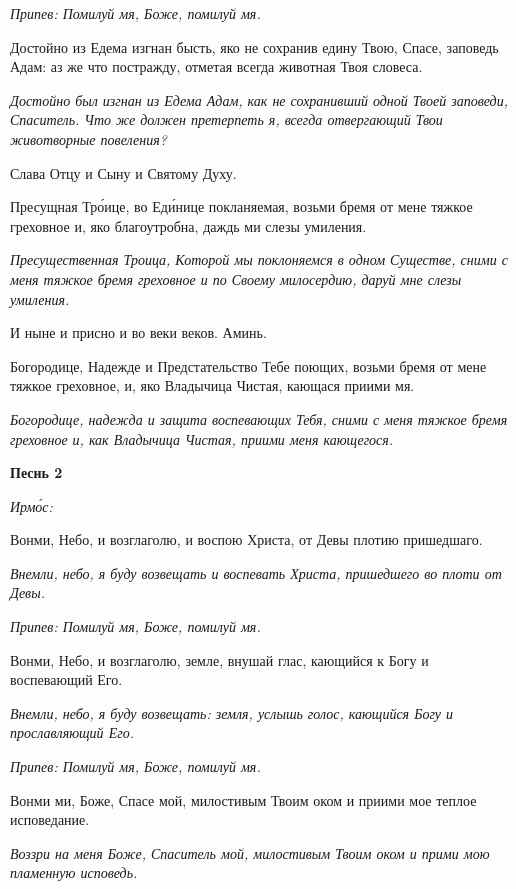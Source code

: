 \itshape Припев:\normalfont{} Помилуй мя, Боже, помилуй мя.


Достойно из Едема изгнан бысть, яко не сохранив едину Твою, Спасе, заповедь Адам: аз же что постражду, отметая всегда животная Твоя словеса.


\itshape Достойно был изгнан из Едема Адам, как не сохранивший одной Твоей заповеди, Спаситель. Что же должен претерпеть я, всегда отвергающий Твои животворные повеления?\normalfont{}


Слава Отцу и Сыну и Святому Духу.


Пресущная Тро́ице, во Еди́нице покланяемая, возьми бремя от мене тяжкое греховное и, яко благоутробна, даждь ми слезы умиления.


\itshape Пресущественная Троица, Которой мы поклоняемся в одном Существе, сними с меня тяжкое бремя греховное и по Своему милосердию, даруй мне слезы умиления.\normalfont{}


И ныне и присно и во веки веков. Аминь.


Богородице, Надежде и Предстательство Тебе поющих, возьми бремя от мене тяжкое греховное, и, яко Владычица Чистая, кающася приими мя.


\itshape Богородице, надежда и защита воспевающих Тебя, сними с меня тяжкое бремя греховное и, как Владычица Чистая, приими меня кающегося.\normalfont{}





\bfseries Песнь 2\normalfont{}


\itshape Ирмо́с:\normalfont{}


Вонми, Небо, и возглаголю, и воспою Христа, от Девы плотию пришедшаго.


\itshape Внемли, небо, я буду возвещать и воспевать Христа, пришедшего во плоти от Девы.\normalfont{}


\itshape Припев:\normalfont{} Помилуй мя, Боже, помилуй мя.


Вонми, Небо, и возглаголю, земле, внушай глас, кающийся к Богу и воспевающий Его.


\itshape Внемли, небо, я буду возвещать: земля, услышь голос, кающийся Богу и прославляющий Его.\normalfont{}


\itshape Припев:\normalfont{} Помилуй мя, Боже, помилуй мя.


Вонми ми, Боже, Спасе мой, милостивым Твоим оком и приими мое теплое исповедание.


\itshape Воззри на меня Боже, Спаситель мой, милостивым Твоим оком и прими мою пламенную исповедь.\normalfont{}


